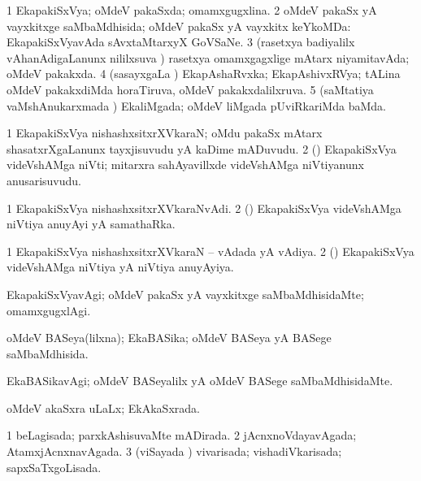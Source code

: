 {{\bentry 
{} 
\gl{\gu}
\expl{}
\bmng
\bnum
\num{1} EkapakiSxVya; oMdeV pakaSxda; omamxgugxlina. 
\num{2} oMdeV pakaSx yA vayxkitxge saMbaMdhisida; oMdeV pakaSx yA vayxkitx keYkoMDa:  EkapakiSxVyavAda sAvxtaMtarxyX GoVSaNe. 
\num{3} (rasetxya badiyalilx vAhanAdigaLanunx nililxsuva \vi) rasetxya omamxgagxlige mAtarx niyamitavAda; oMdeV pakakxda. 
\num{4} (sasayxgaLa \vi) EkapAshaRvxka; EkapAshivxRVya; tALina oMdeV pakakxdiMda horaTiruva, oMdeV pakakxdalilxruva. 
\num{5} (saMtatiya vaMshAnukarxmada \vi) EkaliMgada; oMdeV liMgada pUviRkariMda baMda. 
\enum
\emng
\eentry

\bentry
{} 
\gl{\nA}
\expl{}
\bmng
\bnum
\num{1} EkapakiSxVya nishashxsitxrXVkaraN; oMdu pakaSx mAtarx shasatxrXgaLanunx tayxjisuvudu yA kaDime mADuvudu. 
\num{2} (\ame) EkapakiSxVya videVshAMga niVti; mitarxra sahAyavillxde videVshAMga niVtiyanunx anusarisuvudu. 
\enum
\emng
\eentry

\bentry
{} 
\gl{\nA}
\expl{}
\bmng
\bnum
\num{1} EkapakiSxVya nishashxsitxrXVkaraNvAdi. 
\num{2} (\ame) EkapakiSxVya videVshAMga niVtiya anuyAyi yA samathaRka. 
\enum
\emng
\eentry

\bentry
{} 
\gl{\gu}
\expl{}
\bmng
\bnum
\num{1} EkapakiSxVya nishashxsitxrXVkaraN -- vAdada yA vAdiya. 
\num{2} (\ame) EkapakiSxVya videVshAMga niVtiya yA niVtiya anuyAyiya. 
\enum
\emng
\eentry

\bentry
{} 
\gl{\kirxvi}
\expl{}
\bmng
EkapakiSxVyavAgi; oMdeV pakaSx yA vayxkitxge saMbaMdhisidaMte; omamxgugxlAgi. 
\emng
\eentry

\bentry
{} 
\gl{\gu}
\expl{}
\bmng
oMdeV BASeya(lilxna); EkaBASika; oMdeV BASeya yA BASege saMbaMdhisida. 
\emng
\eentry

\bentry
{} 
\gl{\kirxvi}
\expl{}
\bmng
EkaBASikavAgi; oMdeV BASeyalilx yA oMdeV BASege saMbaMdhisidaMte. 
\emng
\eentry

\bentry
{} 
\gl{\gu}
\expl{}
\bmng
oMdeV akaSxra uLaLx; EkAkaSxrada. 
\emng
\eentry

\bentry
{} 
\gl{\gu}
\expl{}
\bmng
\bnum
\num{1} beLagisada; parxkAshisuvaMte mADirada. 
\num{2} jAcnxnoVdayavAgada; AtamxjAcnxnavAgada. 
\num{3} (viSayada \vi) vivarisada; vishadiVkarisada; sapxSaTxgoLisada. 
\enum
\emng
\eentry

}}
